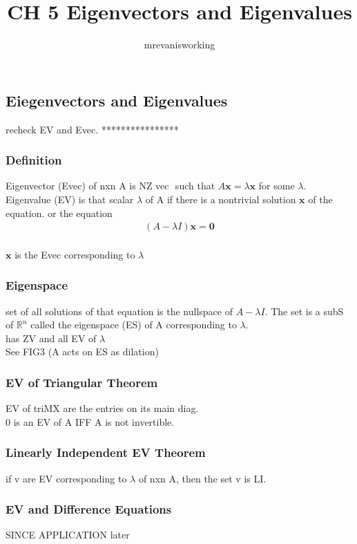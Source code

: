 \documentclass[12pt]{article}
\newcommand{\R}{\mathbb{R}}
\begin{document}
\title{CH 5 Eigenvectors and Eigenvalues}
\author{mrevanisworking}
\maketitle

\subsection{Eiegenvectors and Eigenvalues}
    recheck EV and Evec.
    ****************
    \subsubsection{Definition}
        Eigenvector (Evec) of nxn A is NZ vec $\bm{}$ such that
        $A\bm{x} = \lambda \bm{x} $  for some $\lambda$. \\
        Eigenvalue (EV) is that scalar $\lambda $ of A if there is a 
        nontrivial solution $\bm{x}$  of the equation. or the
        equation 
        \begin{align*}
            (A-\lambda I) \bm{x} = \bm{0}
        \end{align*}\\
        $\bm{x}$  is the Evec corresponding to $\lambda$  
    \subsubsection{Eigenspace}
       set of all solutions of that equation is the nullspace of
       $A-\lambda I$. The set is a subS of $\R^n$  called the 
       eigenspace (ES) of A corresponding to $\lambda $.\\
       has ZV and all EV of $\lambda $ \\
       See FIG3 (A acts on ES as dilation)
    \subsubsection{EV of Triangular Theorem}
        EV of triMX are the entries on its main diag. \\
        0 is an EV of A IFF A is not invertible.
    \subsubsection{Linearly Independent EV Theorem}
        if v are EV corresponding to $\lambda $  of nxn A,
        then the set v is LI.
    \subsubsection{EV and Difference Equations}
        SINCE APPLICATION later
\end{document}
